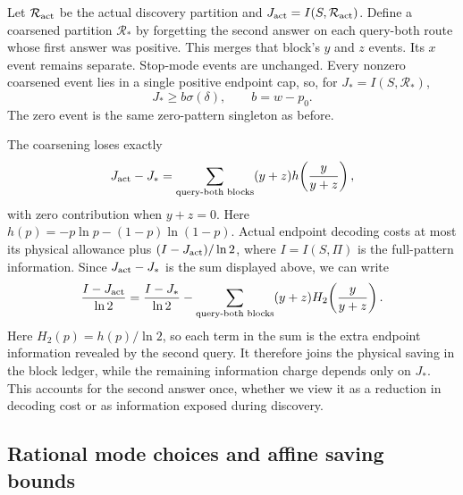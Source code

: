 Let $\mathcal R_{\rm act}$ be the actual discovery partition and
$J_{\rm act}=I(S,\mathcal R_{\rm act})$. Define a coarsened
partition $\mathcal R_*$ by forgetting the second answer on each
query-both route whose first answer was positive. This merges that
block's $y$ and $z$ events. Its $x$ event remains separate. Stop-mode
events are unchanged. Every nonzero coarsened event lies in a single
positive endpoint cap, so, for $J_*=I(S,\mathcal R_*)$,
\begin{equation}\label{eq:coarse-discovery-cap}
 J_*\ge b\sigma(\delta),\qquad b=w-p_0.
\end{equation}
The zero event is the same zero-pattern singleton as before.

The coarsening loses exactly
\[
 J_{\rm act}-J_*
 =\sum_{\text{query-both blocks}}
 (y+z)h\!\left(\frac{y}{y+z}\right),
\]
with zero contribution when $y+z=0$. Here
$h(p)=-p\ln p-(1-p)\ln(1-p)$. Actual endpoint decoding costs
at most its physical allowance plus $(I-J_{\rm act})/\ln2$,
where $I=I(S,\Pi)$ is the full-pattern information. Since
$J_{\rm act}-J_*$ is the sum displayed above, we can write
\[
 \frac{I-J_{\rm act}}{\ln2}
 =\frac{I-J_*}{\ln2}
   -\sum_{\text{query-both blocks}}
      (y+z)H_2\!\left(\frac{y}{y+z}\right).
\]
Here $H_2(p)=h(p)/\ln2$, so each term in the sum is the extra
endpoint information revealed by the second query. It therefore joins
the physical saving in the block ledger, while the remaining
information charge depends only on $J_*$. This accounts for the
second answer once, whether we view it as a reduction in decoding
cost or as information exposed during discovery.

\subsection{Rational mode choices and affine saving bounds}

